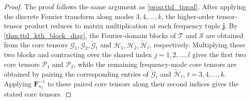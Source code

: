 \documentclass[onefignum,onetabnum]{siamart250211}
\begin{document}
\begin{proof}
The proof follows the same argument as \cref{prop:ttd_tprod}. After applying the discrete Fourier transform along modes $3, 4, \dots,k$, the higher-order tensor-tensor product reduces to matrix multiplication at each frequency tuple
$\boldsymbol{j}$. By \cref{thm:ttd_kth_block_diag}, the
Fourier-domain blocks of $\mathscr{T}$ and $\mathscr{S}$ are obtained from the
core tensors $\mathscr{G}_1,\mathscr{G}_2,\widetilde{\mathscr{G}}_t$ and
$\mathscr{H}_1,\mathscr{H}_2,\widetilde{\mathscr{H}}_t$, respectively.
Multiplying these two blocks and contracting over the shared index
$j=1,2, \dots,l$ gives the first two core tensors $\mathscr{P}_1$ and $\mathscr{P}_2$,
while the remaining frequency-mode core tensors are obtained by pairing the
corresponding entries of $\widetilde{\mathscr{G}}_t$ and
$\widetilde{\mathscr{H}}_t$, $t=3, 4, \dots,k$. Applying $\textbf{F}_{n_t}^{-1}$ to
these paired core tensors along their second indices gives the stated  core tensors.
\end{proof}

\end{document}
